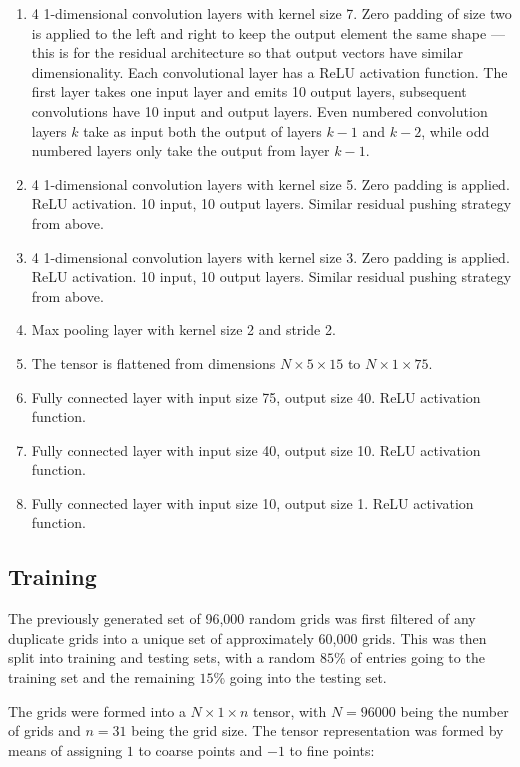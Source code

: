 \begin{enumerate}
\item 4 1-dimensional convolution layers with kernel size 7.  Zero padding of size two is applied to the left and right to keep the output element the same shape --- this is for the residual architecture so that output vectors have similar dimensionality.  Each convolutional layer has a ReLU activation function.  The first layer takes one input layer and emits 10 output layers, subsequent convolutions have 10 input and output layers.  Even numbered convolution layers $k$ take as input both the output of layers $k-1$ and $k-2$, while odd numbered layers only take the output from layer $k-1$.
\item 4 1-dimensional convolution layers with kernel size 5.  Zero padding is applied.  ReLU activation.  10 input, 10 output layers.  Similar residual pushing strategy from above.
\item 4 1-dimensional convolution layers with kernel size 3.  Zero padding is applied.  ReLU activation.  10 input, 10 output layers.  Similar residual pushing strategy from above.
\item Max pooling layer with kernel size 2 and stride 2.
\item The tensor is flattened from dimensions $N \times 5 \times 15$ to $N \times 1 \times 75$.
\item Fully connected layer with input size 75, output size 40.  ReLU activation function.
\item Fully connected layer with input size 40, output size 10.  ReLU activation function.
\item Fully connected layer with input size 10, output size 1.  ReLU activation function.
\end{enumerate}

\subsection{Training}

The previously generated set of 96,000 random grids was first filtered of any duplicate grids into a unique set of approximately 60,000 grids.  This was then split into training and testing sets, with a random $85\%$ of entries going to the training set and the remaining $15\%$ going into the testing set.

The grids were formed into a $N\times 1 \times n$ tensor, with $N=96000$ being the number of grids and $n=31$ being the grid size.  The tensor representation was formed by means of assigning $1$ to coarse points and $-1$ to fine points:

